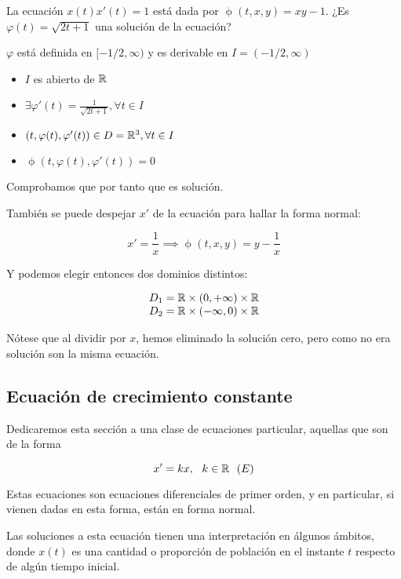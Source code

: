 \begin{ejemplo}
La ecuación $x(t)x'(t) = 1$ está dada por $\upphi(t,x,y) = xy - 1$. ¿Es $\varphi(t) = \sqrt{2t+1}$ una solución de la ecuación?

$\varphi$ está definida en $[-1/2, \infty)$ y es derivable en $I = (-1/2, \infty)$

\begin{itemize}
\item $I$ es abierto de $\mathbb{R}$
\item $\exists \varphi'(t) = \frac{1}{\sqrt{2t+1}}, \forall t \in I$
\item $(t, \varphi(t), \varphi'(t)) \in D = \mathbb{R}^3, \forall t \in I$
\item $\upphi\left(t, \varphi(t), \varphi'(t)\right) = 0$
\end{itemize}

Comprobamos que por tanto que es solución.

También se puede despejar $x'$ de la ecuación para hallar la forma normal:

\[ x' = \frac{1}{x} \implies \upphi(t, x, y) = y-\frac{1}{x} \]

Y podemos elegir entonces dos dominios distintos:

\[ 
\begin{array}{l}
  D_1 = \mathbb{R} \times (0,+\infty )\times \mathbb{R} \\
  D_2 = \mathbb{R} \times (-\infty ,0)\times \mathbb{R}
\end{array}
\]

Nótese que al dividir por $x$, hemos eliminado la solución cero, pero como no era solución son la misma ecuación.


\end{ejemplo}

\subsection{Ecuación de crecimiento constante}

Dedicaremos esta sección a una clase de ecuaciones particular, aquellas que son de la forma

\[ x' = kx,\ \ k\in \mathbb{R} \ \ (E) \]

Estas ecuaciones son ecuaciones diferenciales de primer orden, y en particular, si vienen dadas en esta forma, están en forma normal.

Las soluciones a esta ecuación tienen una interpretación en álgunos ámbitos, donde $x(t)$ es una cantidad o proporción de población en el instante $t$ respecto de algún tiempo inicial.\\


